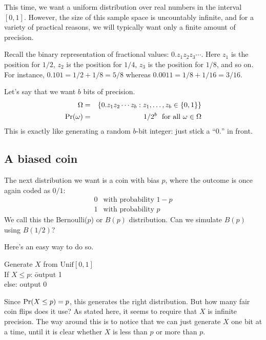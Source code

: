This time, we want a uniform distribution over real numbers in the interval $[0,1]$.
However, the size of this sample space is uncountably infinite, and for a variety
of practical reasons, we will typically want only a finite amount of precision.

Recall the binary representation of fractional values: $0.z_1z_2z_3 \cdots$. Here
$z_1$ is the position for $1/2$, $z_2$ is the position for $1/4$, $z_3$ is the 
position for $1/8$, and so on. For instance, $0.101 = 1/2 + 1/8 = 5/8$ whereas 
$0.0011 = 1/8 + 1/16 = 3/16$.

Let's say that we want $b$ bits of precision.
\begin{eqnarray*}
\Omega & = & \{0.z_1z_2\cdots z_b: z_1, \ldots, z_b \in \{0,1\}\} \\
\mbox{\rm Pr}(\omega) & = & 1/2^b \mbox{\ \ for all $\omega \in \Omega$}
\end{eqnarray*}
This is exactly like generating a random $b$-bit integer: just stick a ``$0.$'' in front.

\subsection{A biased coin}

The next distribution we want is a coin with bias $p$, where the outcome is once again coded
as $0/1$:
$$ \begin{array}{ll}
    0 & \mbox{with probability $1-p$} \\
    1 & \mbox{with probability $p$}
\end{array}$$
We call this the Bernoulli($p$) or $B(p)$ distribution. Can we simulate $B(p)$ using
$B(1/2)$? 

Here's an easy way to do so.

\begin{tt}
\begin{tabbing}
Generate $X$ from $\mbox{Unif}[0,1]$ \\
If $X \leq p$: \= output 1 \\
else:          \> output 0
\end{tabbing}
\end{tt}

\noindent
Since $\mbox{\rm Pr}(X \leq p) = p$, this generates the right distribution. But how many
fair coin flips does it use? As stated here, it seems to require that $X$ is
infinite precision. The way around this is to notice that we can just generate
$X$ one bit at a time, until it is clear whether $X$ is less than $p$ or more 
than $p$.

